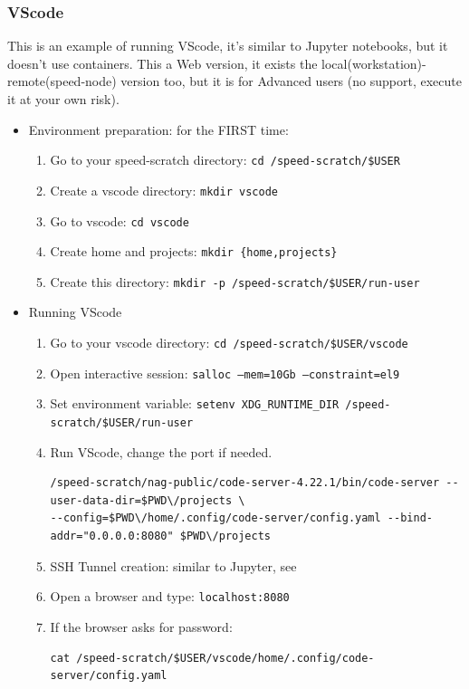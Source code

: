 \subsubsection{VScode}
\label{sect:vscode}

This is an example of running VScode, it's similar to Jupyter notebooks, but it doesn't use containers.
This a Web version, it exists the local(workstation)-remote(speed-node) version too, but it is for Advanced users (no support, execute it at your own risk).

\begin{itemize}
\item
Environment preparation: for the FIRST time:
\begin{enumerate}
\item
Go to your speed-scratch directory: \texttt{cd /speed-scratch/\$USER}
\item
Create a vscode directory: \texttt{mkdir vscode}
\item
Go to vscode: \texttt{cd vscode}
\item
Create home and projects: \texttt{mkdir \{home,projects\}}
\item
Create this directory: \texttt {mkdir -p /speed-scratch/\$USER/run-user}
\end{enumerate}
\item
Running VScode
\begin{enumerate}
\item 
Go to your vscode directory: \texttt{cd /speed-scratch/\$USER/vscode}
\item
Open interactive session: \texttt {salloc --mem=10Gb --constraint=el9}
\item
Set environment variable: \texttt {setenv XDG\_RUNTIME\_DIR /speed-scratch/\$USER/run-user}
\item 
Run VScode, change the port if needed.
\scriptsize
\begin{verbatim}
/speed-scratch/nag-public/code-server-4.22.1/bin/code-server --user-data-dir=$PWD\/projects \
--config=$PWD\/home/.config/code-server/config.yaml --bind-addr="0.0.0.0:8080" $PWD\/projects
\end{verbatim}
\normalsize
\item
SSH Tunnel creation: similar to Jupyter, see 
\item
Open a browser and type: \texttt {localhost:8080}
\item
If the browser asks for password: 
\begin{verbatim}
cat /speed-scratch/$USER/vscode/home/.config/code-server/config.yaml
\end{verbatim}

\end{enumerate}
\end{itemize}

